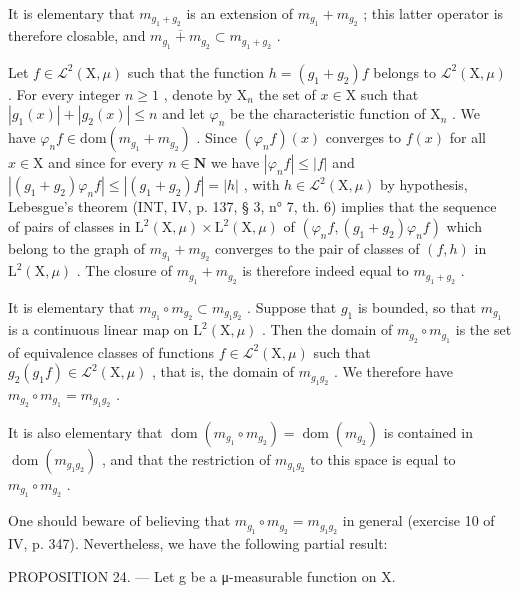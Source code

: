 It is elementary that \(m_{g_{1}+g_{2}}\) is an extension of \(m_{g_{1}} + m_{g_{2}}\) ; this latter operator is therefore closable, and \(\overline{m_{g_{1}} + m_{g_{2}}} \subset m_{g_{1}+g_{2}}\) .

Let \(f \in \mathcal{L}^2(\mathrm{X},\mu)\) such that the function \(h = (g_1 + g_2)f\) belongs to \(\mathcal{L}^2(\mathrm{X},\mu)\) . For every integer \(n \geqslant 1\) , denote by \(\mathrm{X}_n\) the set of \(x \in \mathrm{X}\) such that \(|g_1(x)| + |g_2(x)| \leqslant n\) and let \(\varphi_n\) be the characteristic function of \(\mathrm{X}_n\) . We have \(\varphi_n f \in \mathrm{dom}(m_{g_1} + m_{g_2})\) . Since \((\varphi_n f)(x)\) converges to \(f(x)\) for all \(x \in \mathrm{X}\) and since for every \(n \in \mathbf{N}\) we have \(|\varphi_n f| \leqslant |f|\) and \(|(g_1 + g_2)\varphi_n f| \leqslant |(g_1 + g_2)f| = |h|\) , with \(h \in \mathcal{L}^2(\mathrm{X},\mu)\) by hypothesis, Lebesgue's theorem (INT, IV, p. 137, § 3, n° 7, th. 6) implies that the sequence of pairs of classes in \(\mathrm{L}^{2}(\mathrm{X},\mu)\times\mathrm{L}^{2}(\mathrm{X},\mu)\) of \((\varphi_{n}f,(g_{1}+g_{2})\varphi_{n}f)\) which belong to the graph of \(m_{g_{1}}+m_{g_{2}}\) converges to the pair of classes of \((f,h)\) in \(\mathrm{L}^{2}(\mathrm{X},\mu)\) . The closure of \(m_{g_{1}}+m_{g_{2}}\) is therefore indeed equal to \(m_{g_{1}+g_{2}}\) .

It is elementary that \(m_{g_{1}} \circ m_{g_{2}} \subset m_{g_{1}g_{2}}\) . Suppose that \(g_{1}\) is bounded, so that \(m_{g_{1}}\) is a continuous linear map on \(\mathrm{L}^{2}(\mathrm{X},\mu)\) . Then the domain of \(m_{g_{2}} \circ m_{g_{1}}\) is the set of equivalence classes of functions \(f \in \mathcal{L}^{2}(\mathrm{X},\mu)\) such that \(g_{2}(g_{1}f) \in \mathcal{L}^{2}(\mathrm{X},\mu)\) , that is, the domain of \(m_{g_{1}g_{2}}\) . We therefore have \(m_{g_{2}} \circ m_{g_{1}} = m_{g_{1}g_{2}}\) .

It is also elementary that \(\operatorname{dom}(m_{g_{1}} \circ m_{g_{2}}) = \operatorname{dom}(m_{g_{2}})\) is contained in \(\operatorname{dom}(m_{g_{1}g_{2}})\) , and that the restriction of \(m_{g_{1}g_{2}}\) to this space is equal to \(m_{g_{1}} \circ m_{g_{2}}\) .

One should beware of believing that \(m_{g_{1}} \circ m_{g_{2}} = m_{g_{1}g_{2}}\) in general (exercise 10 of IV, p. 347). Nevertheless, we have the following partial result:

PROPOSITION 24. --- Let g be a μ-measurable function on X.

